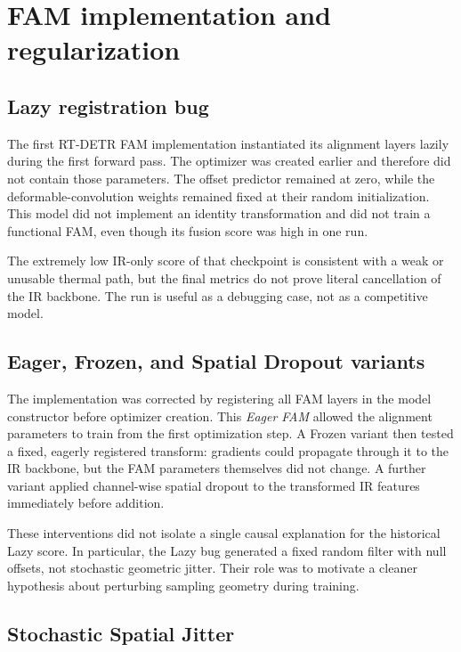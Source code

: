 \section{FAM implementation and regularization}
\label{sec:fam-history}

\subsection{Lazy registration bug}

The first RT-DETR FAM implementation instantiated its alignment layers lazily
during the first forward pass. The optimizer was created earlier and therefore
did not contain those parameters. The offset predictor remained at zero, while
the deformable-convolution weights remained fixed at their random
initialization. This model did not implement an identity transformation and did
not train a functional FAM, even though its fusion score was high in one run.

The extremely low IR-only score of that checkpoint is consistent with a weak
or unusable thermal path, but the final metrics do not prove literal
cancellation of the IR backbone. The run is useful as a debugging case, not as
a competitive model.

\subsection{Eager, Frozen, and Spatial Dropout variants}

The implementation was corrected by registering all FAM layers in the model
constructor before optimizer creation. This \emph{Eager FAM} allowed the
alignment parameters to train from the first optimization step. A Frozen
variant then tested a fixed, eagerly registered transform: gradients could
propagate through it to the IR backbone, but the FAM parameters themselves did
not change. A further variant applied channel-wise spatial dropout to the
transformed IR features immediately before addition.

These interventions did not isolate a single causal explanation for the
historical Lazy score. In particular, the Lazy bug generated a fixed random
filter with null offsets, not stochastic geometric jitter. Their role was to
motivate a cleaner hypothesis about perturbing sampling geometry during
training.

\subsection{Stochastic Spatial Jitter}

